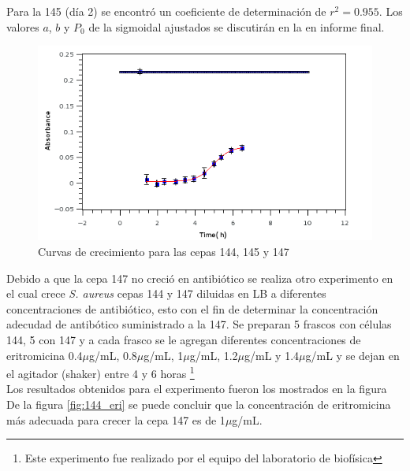 \documentclass[%
 reprint,
 amsmath,amssymb,
 aps,
]{revtex4-2}
\begin{document}
 Para la 145  (d\'{i}a 2) se encontr\'{o} un coeficiente de determinaci\'{o}n de $r^2=0.955$. 
 Los valores $a$, $b$ y $P_{0}$ de la sigmoidal ajustados se discutir\'{a}n en la en informe final.
\begin{figure}[h]
\includegraphics[width=\linewidth]{curvas/gra145dia2.png}
  \caption{Curvas de crecimiento para las cepas 144, 145 y 147}
  \label{fig:cur4}
\end{figure}
Debido a que la cepa 147 no creci\'{o} en antibi\'{o}tico se realiza otro experimento en el cual crece \textit{S. aureus} cepas 144 y 147 diluidas en LB a diferentes concentraciones de antibi\'{o}tico, esto con el fin de determinar la concentraci\'{o}n adecudad de antib\'{o}tico suministrado a la 147. Se preparan 5 frascos con c\'{e}lulas 144, 5 con 147 y a cada frasco se le agregan diferentes concentraciones de eritromicina 0.4$\mu$g/mL, 0.8$\mu$g/mL, 1$\mu$g/mL, 1.2$\mu$g/mL y 1.4$\mu$g/mL y se dejan en el agitador (shaker) entre 4 y 6 horas \footnote{Este experimento fue realizado por el equipo del laboratorio de biof\'{i}sica}\\
Los resultados obtenidos para el experimento fueron los mostrados en la figura \\
De la figura \ref{fig:144_eri} se puede concluir que la concentraci\'{o}n de eritromicina m\'{a}s adecuada para crecer la cepa 147 es de 1$\mu$g/mL.
\end{document}
